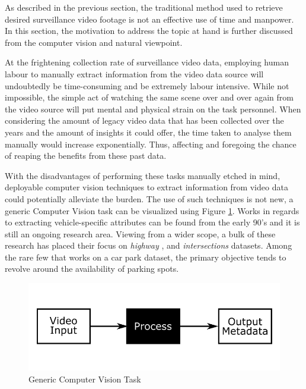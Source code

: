 As described in the previous section, the traditional method used to retrieve desired surveillance video footage is not an effective use of time and manpower. In this section, the motivation to address the topic at hand is further discussed from the computer vision and natural viewpoint.


At the frightening collection rate of surveillance video data, employing human labour to manually extract information from the video data source will undoubtedly be time-consuming and be extremely labour intensive.
While not impossible, the simple act of watching the same scene over and over again from the video source will put mental and physical strain on the task personnel. When considering the amount of legacy video data that has been collected over the years and the amount of insights it could offer, the time taken to analyse them manually would increase exponentially. Thus, affecting and foregoing the chance of reaping the benefits from these past data.

With the disadvantages of performing these tasks manually etched in mind, deployable computer vision techniques to extract information from video data could potentially alleviate the burden. The use of such techniques is not new, a generic Computer Vision task can be visualized using Figure \ref{fig:genericCV}. Works in regards to extracting vehicle-specific attributes can be found from the early 90's and it is still an ongoing research area. Viewing from a wider scope, a bulk of these research has placed their focus on \textit{highway} \cite{yu2017improved, cao2016vehicle, arya2016real, liu2016highway, al2016adaptive}, and  \textit{intersections} \cite{meng2017traffic, choong2017modeling, ren2018learning} datasets. Among the rare few \cite{shi2017study, marmol2016quickspot, ling2017identifying} that works on a car park dataset, the primary objective tends to revolve around the availability of parking spots.

\begin{figure}[!hbt]\centering
\includegraphics[width=.8\textwidth]{image/general/simpleframe.png}
\caption{Generic Computer Vision Task}
\label{fig:genericCV}
\end{figure}

